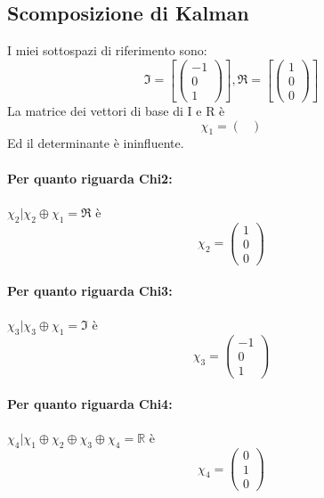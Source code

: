 \documentclass{article}
\begin{document}
\subsection{Scomposizione di Kalman}
I miei sottospazi di riferimento sono:	\[ \mathfrak{I} = \left[ \left(\begin{matrix}-1\\0\\1\end{matrix}\right)\right], \mathfrak{R} = \left[ \left(\begin{matrix}1\\0\\0\end{matrix}\right)\right] \]
La matrice dei vettori di base di I e R è \[ \chi_1 =  \left(\begin{matrix}\end{matrix}\right) \]Ed il determinante è ininfluente.
\paragraph{Per quanto riguarda Chi2:} $ \chi_2 | \chi_2 \oplus \chi_1 = \mathfrak{R} $ è \[ \chi_2 = \left(\begin{matrix}1\\0\\0\end{matrix}\right) \]

\paragraph{Per quanto riguarda Chi3:} $ \chi_3 | \chi_3 \oplus \chi_1 = \mathfrak{I} $ è \[ \chi_3 = \left(\begin{matrix}-1\\0\\1\end{matrix}\right) \]

\paragraph{Per quanto riguarda Chi4:} $ \chi_4 | \chi_1 \oplus \chi_2 \oplus  \chi_3 \oplus \chi_4 = \mathbb{R} $ è \[ \chi_4 = \left(\begin{matrix}0\\1\\0\end{matrix}\right) \]
\end{document}
